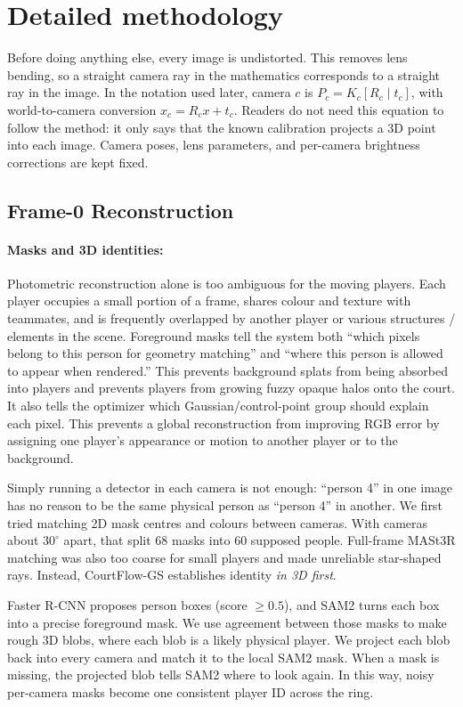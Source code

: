 \documentclass[11pt]{article}
\begin{document}
\appendix

\section{Detailed methodology}\label{app:method}
Before doing anything else, every image is undistorted. This removes lens bending, so a straight
camera ray in the mathematics corresponds to a straight ray in the image. In the notation used
later, camera $c$ is $P_c=K_c[R_c\mid t_c]$, with world-to-camera conversion $x_c=R_cx+t_c$.
Readers do not need this equation to follow the method: it only says that the known calibration
projects a 3D point into each image. Camera poses, lens parameters, and per-camera brightness
corrections are kept fixed.

\subsection{Frame-0 Reconstruction}
\paragraph{Masks and 3D identities:}
Photometric reconstruction alone is too ambiguous for the moving players. Each player occupies a
small portion of a frame, shares colour and texture with teammates, and is frequently overlapped
by another player or various structures / elements in the scene.
Foreground masks tell the system both ``which pixels belong to this person for geometry matching''
and ``where this person is allowed to appear when rendered.''
This prevents background splats from being absorbed into players and prevents players from
growing fuzzy opaque halos onto the court. It also tells the optimizer which
Gaussian/control-point group should explain each pixel.  This prevents a global reconstruction
from improving RGB error by assigning one player's appearance or motion to another player or to
the background.

Simply running a detector in each camera is not enough: ``person 4'' in one image has no reason to
be the same physical person as ``person 4'' in another. We first tried matching 2D mask centres
and colours between cameras. With cameras about $30^\circ$ apart, that split 68 masks into 60
supposed people. Full-frame MASt3R matching was also too coarse for small players and made
unreliable star-shaped rays. Instead, CourtFlow-GS establishes identity \emph{in 3D first}.

Faster R-CNN proposes person boxes (score $\geq0.5$), and SAM2 turns each box into a precise
foreground mask. We use agreement between those masks to make rough 3D blobs, where each blob is
a likely physical player. We project each blob back into every camera and match it to the local
SAM2 mask. When a mask is missing, the projected blob tells SAM2 where to look again. In this way,
noisy per-camera masks become one consistent player ID across the ring.
\end{document}
